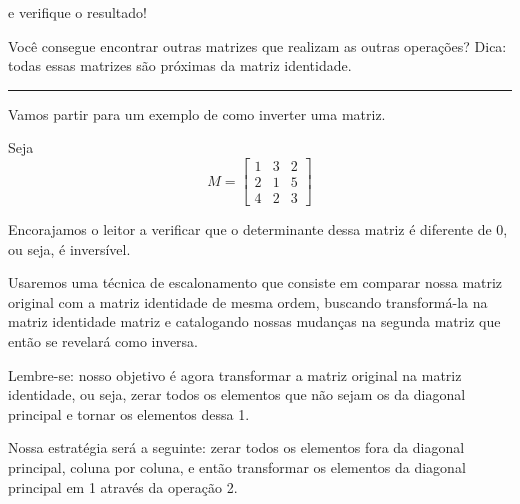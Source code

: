 \documentclass[
  portuguese,
  letterpaper,
  DIV=11,
  numbers=noendperiod]{scrreport}
\begin{document}
e verifique o resultado!

Você consegue encontrar outras matrizes que realizam as outras
operações? Dica: todas essas matrizes são próximas da matriz identidade.

\begin{center}\rule{0.5\linewidth}{0.5pt}\end{center}

Vamos partir para um exemplo de como inverter uma matriz.

Seja \[
M = 
\begin{bmatrix}
    1 & 3 & 2 \\
    2 & 1 & 5 \\
    4 & 2 & 3
\end{bmatrix}
\]

Encorajamos o leitor a verificar que o determinante dessa matriz é
diferente de 0, ou seja, é inversível.

Usaremos uma técnica de escalonamento que consiste em comparar nossa
matriz original com a matriz identidade de mesma ordem, buscando
transformá-la na matriz identidade matriz e catalogando nossas mudanças
na segunda matriz que então se revelará como inversa.

Lembre-se: nosso objetivo é agora transformar a matriz original na
matriz identidade, ou seja, zerar todos os elementos que não sejam os da
diagonal principal e tornar os elementos dessa 1.

Nossa estratégia será a seguinte: zerar todos os elementos fora da
diagonal principal, coluna por coluna, e então transformar os elementos
da diagonal principal em 1 através da operação 2.
\end{document}
